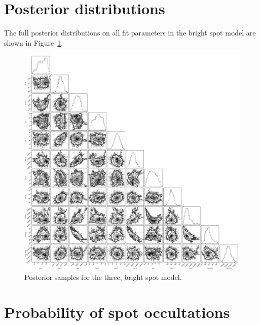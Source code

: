 \begin{subappendices}
\section{Posterior distributions}

The full posterior distributions on all fit parameters in the bright spot model are shown in Figure~\ref{fig:corner}. 

\begin{figure}
\begin{center}
\includegraphics[scale=0.3]{trappist1_bright/corner_bright_spitzer.pdf}
\end{center}
\caption{Posterior samples for the three, bright spot model. \label{fig:corner}}
\end{figure}

\section{Probability of spot occultations}


\end{subappendices}
